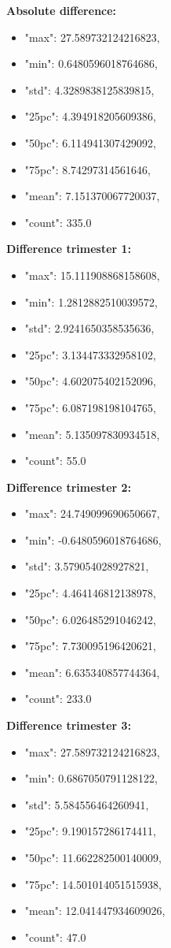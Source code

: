 	\textbf{Absolute difference:}
	\begin{itemize}
		\item "max": 27.589732124216823,
		\item "min": 0.6480596018764686,
		\item "std": 4.3289838125839815,
		\item "25pc": 4.394918205609386,
		\item "50pc": 6.114941307429092,
		\item "75pc": 8.74297314561646,
		\item "mean": 7.151370067720037,
		\item "count": 335.0
	\end{itemize}

	\textbf{Difference trimester 1:}
	\begin{itemize}
		\item "max": 15.111908868158608,
		\item "min": 1.2812882510039572,
		\item "std": 2.9241650358535636,
		\item "25pc": 3.134473332958102,
		\item "50pc": 4.602075402152096,
		\item "75pc": 6.087198198104765,
		\item "mean": 5.135097830934518,
		\item "count": 55.0
	\end{itemize}

	\textbf{Difference trimester 2:}
	\begin{itemize}
		\item "max": 24.749099690650667,
		\item "min": -0.6480596018764686,
		\item "std": 3.579054028927821,
		\item "25pc": 4.464146812138978,
		\item "50pc": 6.026485291046242,
		\item "75pc": 7.730095196420621,
		\item "mean": 6.635340857744364,
		\item "count": 233.0
	\end{itemize}

	\textbf{Difference trimester 3:}
	\begin{itemize}
		\item "max": 27.589732124216823,
		\item "min": 0.6867050791128122,
		\item "std": 5.584556464260941,
		\item "25pc": 9.190157286174411,
		\item "50pc": 11.662282500140009,
		\item "75pc": 14.501014051515938,
		\item "mean": 12.041447934609026,
		\item "count": 47.0
	\end{itemize}

